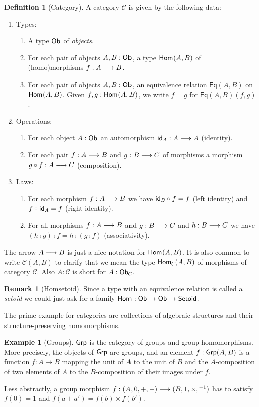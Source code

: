 \documentclass[a4paper,fleqn]{scrartcl}
\theoremstyle{definition}
\newtheorem{definition}{Definition}
\newtheorem{remark}{Remark}
\newtheorem{example}{Example}
\newcommand{\C}{\mathcal{C}}
\newcommand{\Eq}{\mathsf{Eq}}
\begin{document}
\begin{definition}[Category]
  \label{def:cat}
  A category $\C$ is given by the following data:
  \begin{enumerate}
  \item Types:
    \begin{enumerate}
    \item A type $\Ob$ of \emph{objects}.
    \item For each pair of objects $A,B : \Ob$, a type $\Hom(A,B)$ of
      (homo)morphisms $f : A \too B$.
    \item For each pair of objects $A,B : \Ob$, an equivalence
      relation $\Eq(A,B)$ on $\Hom(A,B)$.
      Given $f,g : \Hom(A,B)$, we write $f = g$ for $\Eq(A,B)(f,g)$.
    \end{enumerate}
  \item Operations:
    \begin{enumerate}
    \item For each object $A : \Ob$ an automorphism $\id[A] : A \too
      A$ (identity).
    \item For each pair $f : A \too B$ and $g : B \too C$ of morphisms a
      morphism $g \comp f : A \too C$ (composition).
    \end{enumerate}
  \item Laws:
    \begin{enumerate}
    \item For each morphism $f : A \too B$ we have $\id[B] \comp f = f$
      (left identity)
      and $f \comp \id[A] = f$ (right identity).
    \item For all morphisms $f : A \too B$ and $g : B \too C$ and $h : B
      \too C$ we have $(h \comp g) \comp f = h \comp (g \comp f)$ (associativity).
    \end{enumerate}
  \end{enumerate}
\end{definition}
The arrow $A \too B$ is just a nice notation for $\Hom(A,B)$.
It is also common to write $\C(A,B)$ to clarify that we mean the type $\Hom[\C](A,B)$
of morphisms of category $\C$.  Also $A : \C$ is short for $A : \Ob[\C]$.
\begin{remark}[Homsetoid]
Since a type with an equivalence relation is called a \emph{setoid} we
could just ask for a family $\Hom : \Ob \to \Ob \to \Setoid$.
\end{remark}
The prime example for categories are collections of algebraic
structures and their structure-preserving homomorphisms.
\begin{example}[Groups]
  $\Grp$ is the category of groups and group homomorphisms.  More
  precisely, the objects of $\Grp$ are groups, and an element
  $f : \Grp(A,B)$ is a function $f : A \to B$ mapping the unit of $A$
  to the unit of $B$ and the $A$-composition of two elements of $A$ to
  the $B$-composition of their images under $f$.

  Less abstractly, a group morphism $f : (A,0,+,-) \too (B,1,\times,{}^{-1})$
  has to satisfy $f(0) = 1$ and $f(a+a') = f(b) \times f(b')$.
\end{example}
\end{document}
